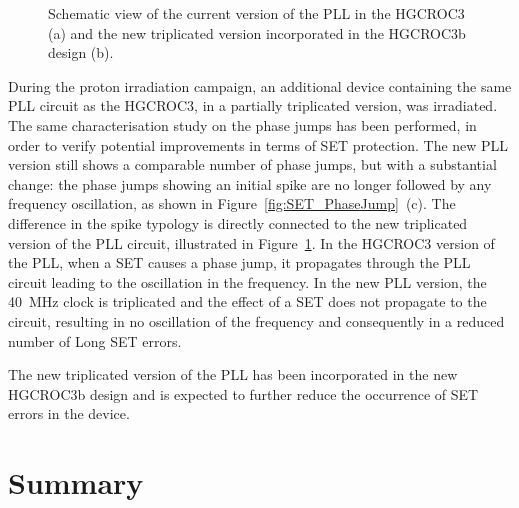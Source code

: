 \begin{figure}[b!]
    \centering
    \caption{Schematic view of the current version of the PLL in the HGCROC3 (a) and the new triplicated version incorporated in the HGCROC3b design (b).}
    \label{fig:PLL_HGCROC3b}
\end{figure}

\bigbreak

During the proton irradiation campaign, an additional device containing the same PLL circuit as the HGCROC3, in a partially triplicated version, was irradiated.
The same characterisation study on the phase jumps has been performed, in order to verify potential improvements in terms of SET protection.
The new PLL version still shows a comparable number of phase jumps, but with a substantial change: the phase jumps showing an initial spike are no longer followed by any frequency oscillation, as shown in Figure~\ref{fig:SET_PhaseJump}~(c).
The difference in the spike typology is directly connected to the new triplicated version of the PLL circuit, illustrated in Figure~\ref{fig:PLL_HGCROC3b}.
In the HGCROC3 version of the PLL, when a SET causes a phase jump, it propagates through the PLL circuit leading to the oscillation in the frequency.
In the new PLL version, the 40~MHz clock is triplicated and the effect of a SET does not propagate to the circuit, resulting in no oscillation of the frequency and consequently in a reduced number of Long SET errors.

The new triplicated version of the PLL has been incorporated in the new HGCROC3b design and is expected to further reduce the occurrence of SET errors in the device.

\section*{Summary}

